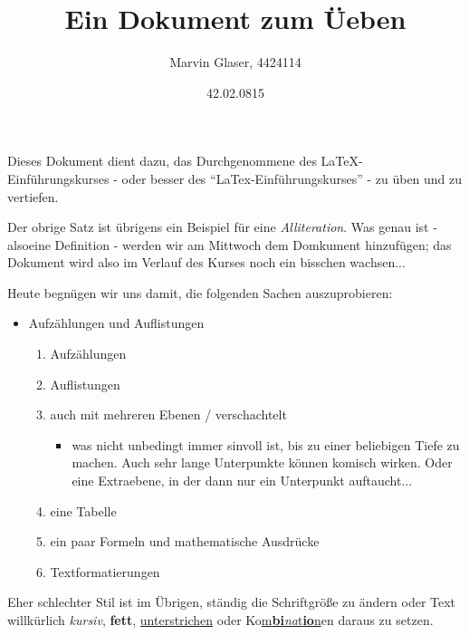 \documentclass{scrartcl}
\title{Ein Dokument zum Üeben}
\author{Marvin Glaser, 4424114}
\date{42.02.0815}
\begin{document}
 \maketitle

 Dieses Dokument dient dazu, das Durchgenommene des \LaTeX-Einführungskurses - oder besser des ``LaTex-Einführungskurses'' - zu üben und zu vertiefen. \par
 Der obrige Satz ist übrigens ein Beispiel für eine {\itshape Alliteration}. Was genau ist - also\newline eine Definition - werden wir am Mittwoch dem Domkument hinzufügen; das Dokument wird also im Verlauf des Kurses noch ein bisschen wachsen... \par
 Heute begnügen wir uns damit, die folgenden Sachen auszuprobieren:
 
 \begin{itemize}
  \item Aufzählungen und Auflistungen
        \begin{enumerate}
            \item Aufzählungen
            \item Auflistungen
            \item auch mit mehreren Ebenen / verschachtelt
                \begin{itemize}
                 \item was nicht unbedingt immer sinvoll ist, bis zu einer beliebigen Tiefe zu machen. Auch sehr lange Unterpunkte können komisch wirken. Oder eine Extraebene, in der dann nur ein Unterpunkt auftaucht...
                \end{itemize}
            \item eine Tabelle
            \item ein paar Formeln und mathematische Ausdrücke
            \item Textformatierungen
        \end{enumerate}
 \end{itemize}\par
 
Eher schlechter Stil ist {\tiny im Übrigen}, {\Huge ständig} die {\Large Schriftgröße} zu ändern oder Text will{\Huge kürli}ch {\itshape kursiv}, \textbf {fett}, \underline{unterstrichen} oder Ko\underline{m\textbf{bi}{\itshape na}t\textbf{io}n}en daraus zu setzen.
 
 
\end{document}
